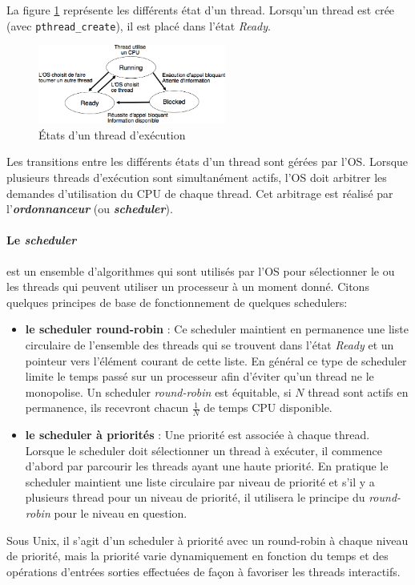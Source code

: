 La figure \ref{fig:appelsbloquant} représente les différents état d'un thread.
Lorsqu'un thread est crée (avec \texttt{pthread\_create}), il est placé dans l'état \textit{Ready}. \\
\begin{figure}
  \vspace{-0.5cm}
  \includegraphics[width=0.55\textwidth]{appelsbloquant}
  \caption{\label{fig:appelsbloquant}États d'un thread d'exécution}
  \vspace{-0.5cm}
\end{figure}

Les transitions entre les différents états d'un thread sont gérées par l'OS.
Lorsque plusieurs threads d'exécution sont simultanément actifs, l'OS doit arbitrer les demandes d'utilisation du CPU de chaque thread.
Cet arbitrage est réalisé par l'\textit{\textbf{ordonnanceur}} (ou \textbf{\textit{scheduler}}).


\paragraph{Le \textit{scheduler}} est un ensemble d'algorithmes qui sont utilisés par l'OS pour sélectionner le ou les threads qui peuvent utiliser un processeur à un moment donné.
Citons quelques principes de base de fonctionnement de quelques schedulers:
\begin{itemize}
  \item \textbf{le scheduler \textbf{round-robin}} : Ce scheduler maintient en permanence une liste circulaire de l'ensemble des threads qui se trouvent dans l'état \textit{Ready} et un pointeur vers l'élément courant de cette liste.
    En général ce type de scheduler limite le temps passé sur un processeur afin d'éviter qu'un thread ne le monopolise.
    Un scheduler \textit{round-robin} est équitable, si $N$ thread sont actifs en permanence, ils recevront chacun $\frac{1}{N}$ de temps CPU disponible.
  \item \textbf{le scheduler à priorités} : Une priorité est associée à chaque thread.
    Lorsque le scheduler doit sélectionner un thread à exécuter, il commence d'abord par parcourir les threads ayant une haute priorité.
    En pratique le scheduler maintient une liste circulaire par niveau de priorité et s'il y a plusieurs thread pour un niveau de priorité, il utilisera le principe du \textit{round-robin} pour le niveau en question.
\end{itemize}
Sous Unix, il s'agit d'un scheduler à priorité avec un round-robin à chaque niveau de priorité, mais la priorité varie dynamiquement en fonction du temps et des opérations d'entrées sorties effectuées de façon à favoriser les threads interactifs.

